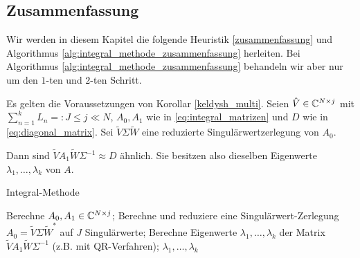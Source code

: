 \subsection*{Zusammenfassung}

Wir werden in diesem Kapitel die folgende Heuristik \ref{zusammenfassung} und Algorithmus \ref{alg:integral_methode_zusammenfassung} herleiten.
Bei Algorithmus \ref{alg:integral_methode_zusammenfassung} behandeln wir aber nur um den $1$-ten und $2$-ten Schritt.

\begin{heuristics} \label{zusammenfassung}

    Es gelten die Voraussetzungen von Korollar \ref{keldysh_multi}.
    Seien $\hat V \in \mathbb{C}^{N \times j}$ mit $\sum_{n=1}^k L_n =: J \leq j \ll N$, $A_0, A_1$ wie in \eqref{eq:integral_matrizen} und $D$ wie in \eqref{eq:diagonal_matrix}.
    Sei $\tilde V \Sigma \tilde W$ eine reduzierte Singulärwertzerlegung von $A_0$.

    Dann sind $\tilde V A_1 \tilde W \Sigma^{-1} \approx D$ ähnlich.
    Sie besitzen also dieselben Eigenwerte $\lambda_1, \dots, \lambda_k$ von $A$.

\end{heuristics}

\begin{algorithm}[H]
	\caption{Integral-Methode}
    \begin{algorithmic}[1]
            \State Berechne $A_0, A_1 \in \mathbb{C}^{N \times j}$;
            \State Berechne und reduziere eine Singulärwert-Zerlegung $A_0 = \tilde V \Sigma \tilde W^\ast$ auf $J$ Singulärwerte;
            \State Berechne Eigenwerte $\lambda_1, \dots, \lambda_k$ der Matrix $\tilde V A_1 \tilde W \Sigma^{-1}$ (z.B. mit QR-Verfahren);
            \State \Return $\lambda_1, \dots, \lambda_k$
		\EndProcedure
    \end{algorithmic}
    \caption{}
    \label{alg:integral_methode_zusammenfassung}
\end{algorithm}
